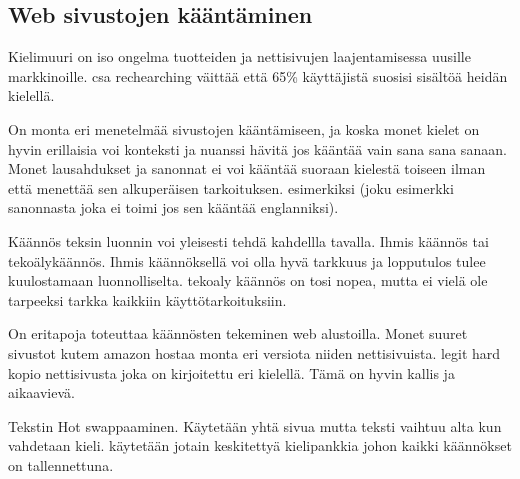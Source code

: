 \documentclass[11pt,a4paper,titlepage,oneside]{article}
\begin{document}
\newpage
\subsection{Web sivustojen kääntäminen}








Kielimuuri on iso ongelma tuotteiden ja nettisivujen laajentamisessa uusille markkinoille.
csa rechearching väittää että 65\% käyttäjistä suosisi sisältöä heidän kielellä.
\medskip






On monta eri menetelmää sivustojen kääntämiseen, 
ja koska monet kielet on hyvin erillaisia voi konteksti ja nuanssi hävitä jos kääntää vain sana sana sanaan.
Monet lausahdukset ja sanonnat ei voi kääntää suoraan kielestä toiseen ilman että menettää sen alkuperäisen tarkoituksen.
esimerkiksi (joku esimerkki sanonnasta joka ei toimi jos sen kääntää englanniksi).
\medskip


Käännös teksin luonnin voi yleisesti tehdä kahdellla tavalla. Ihmis käännös tai tekoälykäännös.
Ihmis käännöksellä voi olla hyvä tarkkuus ja lopputulos tulee kuulostamaan luonnolliselta.
tekoaly käännös on tosi nopea, mutta ei vielä ole tarpeeksi tarkka kaikkiin käyttötarkoituksiin.
\medskip






On eritapoja toteuttaa käännösten tekeminen web alustoilla. Monet suuret sivustot kutem amazon \citemissing{} 
hostaa monta eri versiota niiden nettisivuista.
legit hard kopio nettisivusta joka on kirjoitettu eri kielellä. Tämä on hyvin kallis ja aikaavievä.

Tekstin Hot swappaaminen. Käytetään yhtä sivua mutta teksti vaihtuu alta kun vahdetaan kieli. \citemissing{}
käytetään jotain keskitettyä kielipankkia johon kaikki käännökset on tallennettuna.
\medskip
\end{document}
